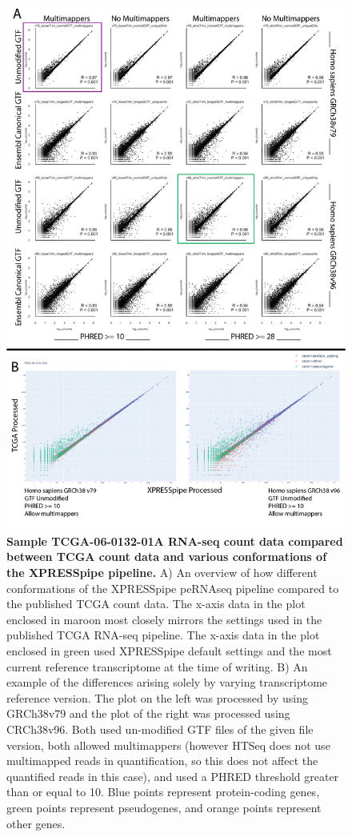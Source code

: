 \documentclass[10pt, oneside]{article}
\begin{document}
\begin{figure}
\centering
  \includegraphics[width=180mm]{figures/xpresspipe_supplement4.png}
  \caption{\textbf{Sample TCGA-06-0132-01A RNA-seq count data compared between TCGA count data and various conformations of the XPRESSpipe pipeline.} A) An overview of how different conformations of the XPRESSpipe peRNAseq pipeline compared to the published TCGA count data. The x-axis data in the plot enclosed in maroon most closely mirrors the settings used in the published TCGA RNA-seq pipeline. The x-axis data in the plot enclosed in green used XPRESSpipe default settings and the most current reference transcriptome at the time of writing. B) An example of the differences arising solely by varying transcriptome reference version. The plot on the left was processed by using GRCh38v79 and the plot of the right was processed using CRCh38v96. Both used un-modified GTF files of the given file version, both allowed multimappers (however HTSeq does not use multimapped reads in quantification, so this does not affect the quantified reads in this case), and used a PHRED threshold greater than or equal to 10. Blue points represent protein-coding genes, green points represent pseudogenes, and orange points represent other genes.}
  \label{fig:supplement4}
\end{figure}
\end{document}
